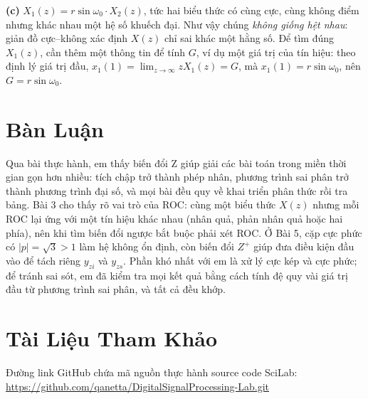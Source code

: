 \documentclass[12pt,a4paper]{article}
\begin{document}
\textbf{(c)} $X_1(z) = r\sin\omega_0 \cdot X_2(z)$, tức hai biểu thức có cùng cực, cùng không điểm nhưng khác nhau một hệ số khuếch đại. Như vậy chúng \emph{không giống hệt nhau}: giản đồ cực--không xác định $X(z)$ chỉ sai khác một hằng số. Để tìm đúng $X_1(z)$, cần thêm một thông tin để tính $G$, ví dụ một giá trị của tín hiệu: theo định lý giá trị đầu, $x_1(1) = \lim_{z\to\infty} z X_1(z) = G$, mà $x_1(1) = r\sin\omega_0$, nên $G = r\sin\omega_0$.

\section{Bàn Luận}
Qua bài thực hành, em thấy biến đổi Z giúp giải các bài toán trong miền thời gian gọn hơn nhiều: tích chập trở thành phép nhân, phương trình sai phân trở thành phương trình đại số, và mọi bài đều quy về khai triển phân thức rồi tra bảng. Bài 3 cho thấy rõ vai trò của ROC: cùng một biểu thức $X(z)$ nhưng mỗi ROC lại ứng với một tín hiệu khác nhau (nhân quả, phản nhân quả hoặc hai phía), nên khi tìm biến đổi ngược bắt buộc phải xét ROC. Ở Bài 5, cặp cực phức có $|p| = \sqrt{3} > 1$ làm hệ không ổn định, còn biến đổi $Z^+$ giúp đưa điều kiện đầu vào để tách riêng $y_{zi}$ và $y_{zs}$. Phần khó nhất với em là xử lý cực kép và cực phức; để tránh sai sót, em đã kiểm tra mọi kết quả bằng cách tính đệ quy vài giá trị đầu từ phương trình sai phân, và tất cả đều khớp.

\section{Tài Liệu Tham Khảo}
Đường link GitHub chứa mã nguồn thực hành source code SciLab: \url{https://github.com/qanetta/DigitalSignalProcessing-Lab.git}
\end{document}
